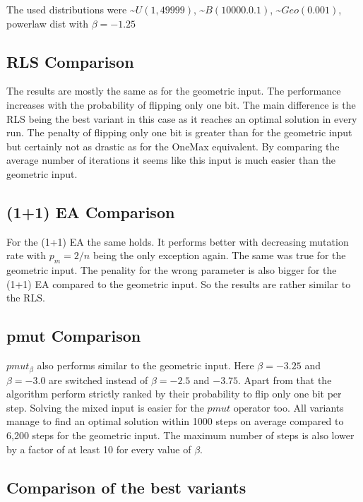 The used distributions were \textasciitilde$U(1,49999)$, \textasciitilde$B(10000.0.1)$, \textasciitilde$Geo(0.001)$, powerlaw dist with $\beta=-1.25$
\subsection{RLS Comparison}




The results are mostly the same as for the geometric input.
The performance increases with the probability of flipping only one bit.
The main difference is the RLS being the best variant in this case as it reaches an optimal solution in every run.
The penalty of flipping only one bit is greater than for the geometric input but certainly not as drastic as for the OneMax equivalent.
By comparing the average number of iterations it seems like this input is much easier than the geometric input.
\subsection{(1+1) EA Comparison}




For the (1+1) EA the same holds.
It performs better with decreasing mutation rate with $p_m=2/n$ being the only exception again.
The same was true for the geometric input.
The penality for the wrong parameter is also bigger for the (1+1) EA compared to the geometric input.
So the results are rather similar to the RLS.
\subsection{pmut Comparison}




$pmut_\beta$ also performs similar to the geometric input.
Here $\beta=-3.25$ and $\beta=-3.0$ are switched instead of $\beta = -2.5$ and $-3.75$.
Apart from that the algorithm perform strictly ranked by their probability to flip only one bit per step.
Solving the mixed input is easier for the $pmut$ operator too.
All variants manage to find an optimal solution within 1000 steps on average compared to 6,200 steps for the geometric input.
The maximum number of steps is also lower by a factor of at least 10 for every value of $\beta$.
\subsection{Comparison of the best variants}


